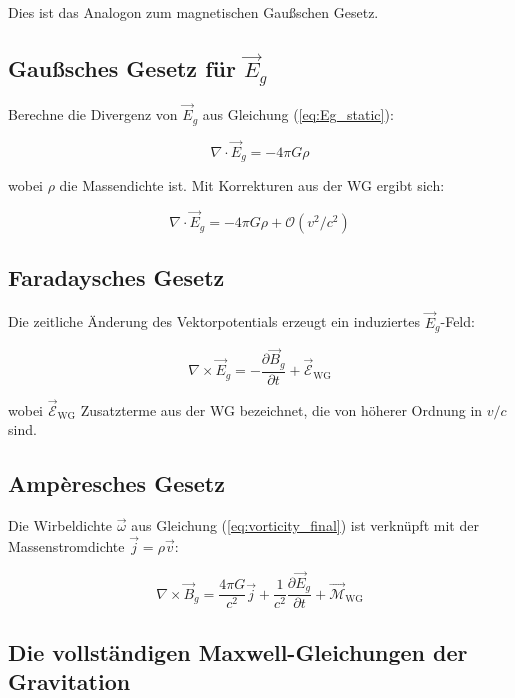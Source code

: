 \documentclass[12pt,a4paper]{article}
\begin{document}
Dies ist das Analogon zum magnetischen Gaußschen Gesetz.

\subsection{Gaußsches Gesetz für \(\vec{E}_g\)}

Berechne die Divergenz von \(\vec{E}_g\) aus Gleichung (\ref{eq:Eg_static}):

\begin{equation}
\nabla \cdot \vec{E}_g = -4\pi G \rho
\label{eq:divEg}
\end{equation}

wobei \(\rho\) die Massendichte ist. Mit Korrekturen aus der WG ergibt sich:

\begin{equation}
\nabla \cdot \vec{E}_g = -4\pi G \rho + \mathcal{O}(v^2/c^2)
\label{eq:divEg_full}
\end{equation}

\subsection{Faradaysches Gesetz}

Die zeitliche Änderung des Vektorpotentials erzeugt ein induziertes \(\vec{E}_g\)-Feld:

\begin{equation}
\nabla \times \vec{E}_g = -\frac{\partial \vec{B}_g}{\partial t} + \vec{\mathcal{E}}_{\text{WG}}
\label{eq:faraday}
\end{equation}

wobei \(\vec{\mathcal{E}}_{\text{WG}}\) Zusatzterme aus der WG bezeichnet, die von höherer Ordnung in \(v/c\) sind.

\subsection{Ampèresches Gesetz}

Die Wirbeldichte \(\vec{\omega}\) aus Gleichung (\ref{eq:vorticity_final}) ist verknüpft mit der Massenstromdichte \(\vec{j} = \rho \vec{v}\):

\begin{equation}
\nabla \times \vec{B}_g = \frac{4\pi G}{c^2} \vec{j} + \frac{1}{c^2} \frac{\partial \vec{E}_g}{\partial t} + \vec{\mathcal{M}}_{\text{WG}}
\label{eq:ampere}
\end{equation}

\subsection{Die vollständigen Maxwell-Gleichungen der Gravitation}
\end{document}
